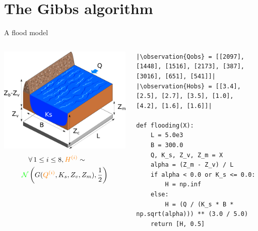\documentclass{beamer}
\newcommand{\likelihood}[1]{\textcolor{green}{#1}}
\newcommand{\observation}[1]{\textcolor{orange}{#1}}
\begin{document}
\section{The Gibbs algorithm}
\begin{frame}[containsverbatim]{A flood model}

        \begin{columns}
            \begin{column}{0.35\textwidth}
                \includegraphics[width=\textwidth]{figures/flooding_section}
                \begin{align*}
                    &\forall \, 1 \leq i  \leq 8, \observation{H^{(i)}} \sim \\
                      \likelihood{\mathcal{N}} &\left(G(\observation{Q^{(i)}}, K_s, Z_v, Z_m), \frac{1}{2}\right)
                \end{align*}
            \end{column}
            \begin{column}{0.65\textwidth}
                \begin{lstlisting}
|\observation{Qobs} = [[2097], [1448], [1516], [2173], [387], [3016], [651], [541]]|
|\observation{Hobs} = [[3.4], [2.5], [2.7], [3.5], [1.0], [4.2], [1.6], [1.6]]|

def flooding(X):
    L = 5.0e3
    B = 300.0
    Q, K_s, Z_v, Z_m = X
    alpha = (Z_m - Z_v) / L
    if alpha < 0.0 or K_s <= 0.0:
        H = np.inf
    else:
        H = (Q / (K_s * B * np.sqrt(alpha))) ** (3.0 / 5.0)
    return [H, 0.5]


\end{lstlisting}
\end{column}
\end{columns}
\end{frame}
\end{document}
